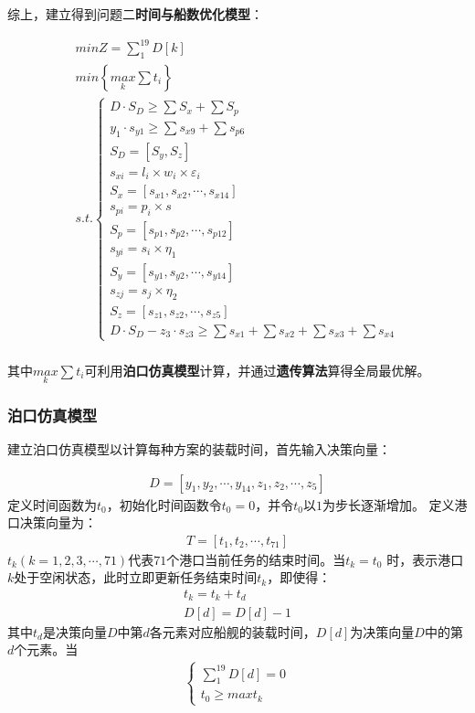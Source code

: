 \documentclass{whutmod}
\begin{document}
	
		综上，建立得到问题二\textbf{时间与船数优化模型}：

	\begin{gather}
min Z=\sum _{1}^{19}D[k]\\
min \left \{ \underset{k}{max}\sum t_{i} \right \}\\
s.t.\left\{\begin{matrix}	 D\cdot S_{D}\geq \sum  S_{x} + \sum  S_{p}
\\ y_{1}\cdot s_{y1}\geq \sum s_{x9}+ \sum  s_{p6}
\\S_{D}=[S_{y}, S_{z}]
\\ s_{xi}=l_{i}\times w_{i} \times \varepsilon _{i}
\\S_{x}=[s_{x1},s_{x2},\cdots,s_{x14}]
\\s_{pi}=p_{i}\times s
\\S_{p}=[s_{p1},s_{p2},\cdots,s_{p12}]
\\     s_{yi}=s_{i}\times \eta_{1}
\\   S_{y}=[s_{y1},s_{y2},\cdots,s_{y14}]
\\      s_{zj}=s_{j}\times \eta_{2}
\\ S_{z}=[s_{z1},s_{z2},\cdots,s_{z5}]
\\	D \cdot S_{D} - z_{3} \cdot s_{z3} \geq  \sum s_{x1}+ \sum s_{x2}+\sum s_{x3}+ \sum s_{x4}
\end{matrix}\right. 
\end{gather}
	     ~\\
	其中$ \underset{k}{max}\sum t_{i} $可利用\textbf{泊口仿真模型}计算，并通过\textbf{遗传算法}算得全局最优解。
	\subsubsection{泊口仿真模型}
	建立泊口仿真模型以计算每种方案的装载时间，首先输入决策向量：

		\begin{gather*}
	 D=[y_{1},y_{2},\cdots,y_{14},z_{1},z_{2},\cdots,z_{5}]
		\end{gather*}
	定义时间函数为$t_{0}$，初始化时间函数令$t_{0}=0$，并令$t_{0}$以$1$为步长逐渐增加。
	定义港口决策向量为：
		\begin{gather*}
		T=[t_{1},t_{2},\cdots,t_{71}]
		\end{gather*}
	$t_{k}(k=1,2,3,\cdots,71)$代表$71$个港口当前任务的结束时间。当$t_{k}=t_{0}$ 时，表示港口$k$处于空闲状态，此时立即更新任务结束时间$t_{k}$，即使得：
		\begin{gather*}
		t_{k}=t_{k}+t_{d}\\
		D[d]=D[d]-1
		\end{gather*}
	其中$t_{d}$是决策向量$D$中第$d$各元素对应船舰的装载时间，$D[d]$为决策向量$D$中的第$d$个元素。当
		\begin{gather*}
	\left\{\begin{matrix} \sum_{1}^{19}D[d]=0
	\\t_{0}\geqslant max t_{k} 	
	\end{matrix}\right.
		\end{gather*}
\end{document}

